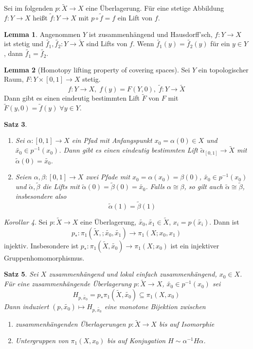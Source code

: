 \documentclass[a4paper, 12pt]{article}
\theoremstyle{plain}
\newtheorem{theorem}{Satz}[section] %
\theoremstyle{definition}
\theoremstyle{lemma}
\newtheorem{lemma}[theorem]{Lemma}
\theoremstyle{remark}
\theoremstyle{corollary}
\newtheorem{corollary}[theorem]{Korollar}
\theoremstyle{example}
\begin{document}
	Sei im folgenden $p: \tilde{X} \to X$ eine Überlagerung. Für eine stetige Abbildung $f:Y \to X$ heißt $\tilde{f}: Y \to X$ mit $p \circ \tilde{f} = f$ ein Lift von $f$.
	\begin{lemma}
		Angenommen $Y$ ist zusammenhängend und Hausdorff'sch, $f:Y \to X$ ist stetig und $\tilde{f_1}, \tilde{f_2}: Y \to \tilde{X}$ sind Lifts von $f$. Wenn $\tilde{f_1}(y) = \tilde{f_2}(y)$ für ein $y \in Y$, dann $\tilde{f_1} = \tilde{f_2}$. 
	\end{lemma}
	\begin{lemma}[Homotopy lifting property of covering spaces]
		Sei $Y$ ein topologischer Raum, $F:Y\times [0,1] \to X$ stetig. \[f:Y \to X, \; f(y) = F(Y,0), \; \tilde{f}: Y \to \tilde{X}\]
		Dann gibt es einen eindeutig bestimmten Lift $\tilde{F}$ von $F$ mit $\tilde{F}(y,0) = \tilde{f}(y) \; \forall y \in Y$.
	\end{lemma}
	\begin{theorem}
		\begin{enumerate}
			\item Sei $\alpha: [0,1] \to X$ ein Pfad mit Anfangspunkt $x_0 = \alpha(0) \in X$ und $\tilde{x_0} \in p^{-1}(x_0)$. Dann gibt es einen eindeutig bestimmten Lift $\tilde{\alpha}_ [0,1] \to \tilde{X}$ mit $\tilde{\alpha}(0) = \tilde{x_0}$.
			\item Seien $\alpha, \beta: [0,1] \to X$ zwei Pfade mit $x_0 = \alpha(x_0) = \beta(0)$, $\tilde{x_0} \in p^{-1}(x_0)$ und $\tilde{\alpha}, \tilde{\beta}$ die Lifts mit $\tilde{\alpha}(0) = \tilde{\beta}(0) = \tilde{x_0}$. Falls $\alpha \cong \beta$, so gilt auch $\tilde{\alpha} \cong \tilde{\beta}$, insbesondere also \[\tilde{\alpha}(1) = \tilde{\beta}(1)\]
		\end{enumerate}
	\end{theorem}
	\begin{corollary}
		Sei $p: \tilde{X} \to X$ eine Überlagerung, $\tilde{x_0}, \tilde{x_1} \in \tilde{X}$, $x_i = p(\tilde{x_i})$. Dann ist \[p_*: \pi_1(\tilde{X},; \tilde{x_0}, \tilde{x_1}) \to \pi_1(X;x_0,x_1)\] injektiv. Insbesondere ist $p_*:\pi_1(\tilde{X}, \tilde{x_0}) \to \pi_1(X;x_0)$ ist ein injektiver Gruppenhomomorphismus.
	\end{corollary}
	\begin{theorem}
		Sei $X$ zusammenhängend und lokal einfach zusammenhängend, $x_0 \in X$. Für eine zusammenhängende Überlagerung $p: \tilde{X} \to X$, $\tilde{x_0} \in p^{-1}(x_0)$ sei \[H_{p,\tilde{x_0}} = p_*\pi_1(\tilde{X}, \tilde{x_0}) \subseteq \pi_1(X,x_0)\]
		Dann induziert $(p,\tilde{x_0}) \mapsto H_{p,\tilde{x_0}}$ eine monotone Bijektion zwischen \begin{enumerate}
			\item zusammenhängenden Überlagerungen $p: \tilde{X} \to X$ bis auf Isomorphie
			\item Untergruppen von $\pi_1(X,x_0)$ bis auf Konjugation $H \sim \alpha^{-1} H \alpha$.
		\end{enumerate}
	\end{theorem}
\end{document}
